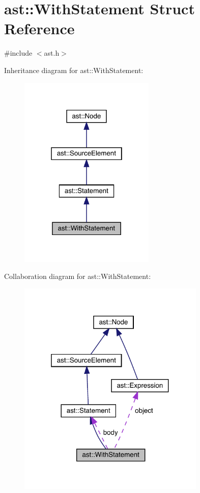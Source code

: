 \hypertarget{structast_1_1_with_statement}{}\section{ast\+:\+:With\+Statement Struct Reference}
\label{structast_1_1_with_statement}


{\ttfamily \#include $<$ast.\+h$>$}



Inheritance diagram for ast\+:\+:With\+Statement\+:
\nopagebreak
\begin{figure}[H]
\begin{center}
\leavevmode
\includegraphics[width=183pt]{structast_1_1_with_statement__inherit__graph}
\end{center}
\end{figure}


Collaboration diagram for ast\+:\+:With\+Statement\+:
\nopagebreak
\begin{figure}[H]
\begin{center}
\leavevmode
\includegraphics[width=253pt]{structast_1_1_with_statement__coll__graph}
\end{center}
\end{figure}
